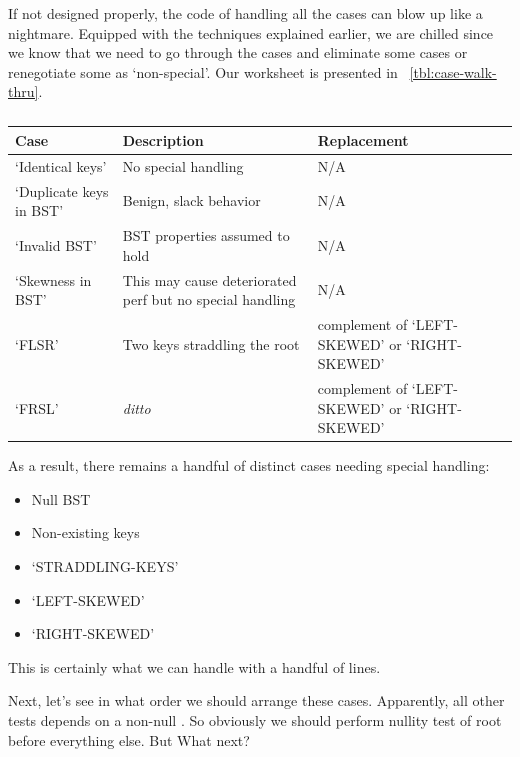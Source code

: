 If not designed properly, the code of handling all the cases can blow up like a nightmare.
Equipped with the techniques explained earlier, we are chilled since we know that we need to
go through the cases and eliminate some cases or renegotiate some as `non-special'.
Our worksheet is presented in ~\autoref{tbl:case-walk-thru}.
\begin{table}[bth]
    \begin{center}
        \caption{
        \label{tbl:case-walk-thru}}
        \begin{tabular}{|p{}|p{}|p{}|}
            \hline
            Case & Description & Replacement \\
            \hline
            `Identical keys' & No special handling & N/A \\
            \hline
            `Duplicate keys in BST' & Benign, slack behavior & N/A \\
            \hline
            `Invalid BST' & BST properties assumed to hold & N/A \\
            \hline
            `Skewness in BST' & This may cause deteriorated perf but no special handling & N/A  \\
            \hline
            `FLSR' & Two keys straddling the root & complement of `LEFT-SKEWED' or `RIGHT-SKEWED' \\
            \hline
            `FRSL' & \textit{ditto} & complement of `LEFT-SKEWED' or `RIGHT-SKEWED' \\
            \hline
        \end{tabular}
    \end{center}
\end{table}
As a result, there remains a handful of distinct cases needing special handling:
\begin{itemize}
    \item Null BST
    \item Non-existing keys
    \item `STRADDLING-KEYS'
    \item `LEFT-SKEWED'
    \item `RIGHT-SKEWED'
\end{itemize}
This is certainly what we can handle with a handful of lines.


Next, let's see in what order we should arrange these cases.
Apparently, all other tests depends on a non-null .
So obviously we should perform nullity test of root before everything else.
But What next?

